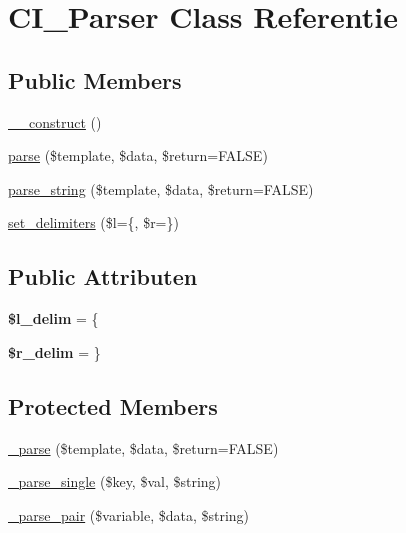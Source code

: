 \hypertarget{class_c_i___parser}{}\section{C\+I\+\_\+\+Parser Class Referentie}
\label{class_c_i___parser}
\subsection*{Public Members}
\begin{DoxyCompactItemize}
\item 
\mbox{\hyperlink{class_c_i___parser_a095c5d389db211932136b53f25f39685}{\+\_\+\+\_\+construct}} ()
\item 
\mbox{\hyperlink{class_c_i___parser_aed3a838a4afdff95c4bf2b1fb5062cbd}{parse}} (\$template, \$data, \$return=F\+A\+L\+SE)
\item 
\mbox{\hyperlink{class_c_i___parser_a5cdfa809d6f2988d2741cb26b5a51d36}{parse\+\_\+string}} (\$template, \$data, \$return=F\+A\+L\+SE)
\item 
\mbox{\hyperlink{class_c_i___parser_afd4d621c3786d2cdb554f3c2f7cf2749}{set\+\_\+delimiters}} (\$l=\textquotesingle{}\{\textquotesingle{}, \$r=\textquotesingle{}\}\textquotesingle{})
\end{DoxyCompactItemize}
\subsection*{Public Attributen}
\begin{DoxyCompactItemize}
\item 
\mbox{\label{class_c_i___parser_ab957da01a735e612795fba1c5802b1fb}} 
{\bfseries \$l\+\_\+delim} = \textquotesingle{}\{\textquotesingle{}
\item 
\mbox{\label{class_c_i___parser_a4d80dc6a622989846dbd0e39fde0f3bb}} 
{\bfseries \$r\+\_\+delim} = \textquotesingle{}\}\textquotesingle{}
\end{DoxyCompactItemize}
\subsection*{Protected Members}
\begin{DoxyCompactItemize}
\item 
\mbox{\hyperlink{class_c_i___parser_a6bd5ad826db82a61de1f3a13031faaf9}{\+\_\+parse}} (\$template, \$data, \$return=F\+A\+L\+SE)
\item 
\mbox{\hyperlink{class_c_i___parser_a01c9bb8a5e8802a1b21acf829cc181e7}{\+\_\+parse\+\_\+single}} (\$key, \$val, \$string)
\item 
\mbox{\hyperlink{class_c_i___parser_a3f01fef88e49c40d679e35dedf89a128}{\+\_\+parse\+\_\+pair}} (\$variable, \$data, \$string)
\end{DoxyCompactItemize}

